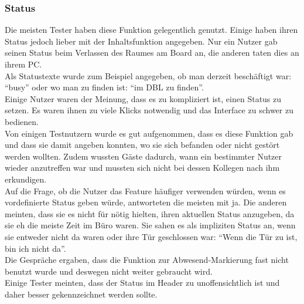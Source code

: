 


\subsubsection{Status}\label{Status}
Die meisten Tester haben diese Funktion gelegentlich genutzt.
Einige haben ihren Status jedoch lieber mit der Inhaltsfunktion angegeben.
Nur ein Nutzer gab seinen Status beim Verlassen des Raumes am Board an, die anderen taten dies an ihrem PC.
\\
Als Statustexte wurde zum Beispiel angegeben, ob man derzeit beschäftigt war: ``busy'' oder wo man zu finden ist: ``im DBL zu finden''.
\\
Einige Nutzer waren der Meinung, dass es zu kompliziert ist, einen Status zu setzen.
Es waren ihnen zu viele Klicks notwendig und das Interface zu schwer zu bedienen.
\\
Von einigen Testnutzern wurde es gut aufgenommen, dass es diese Funktion gab und dass sie damit angeben konnten, wo sie sich befanden oder nicht gestört werden wollten.
Zudem wussten Gäste dadurch, wann ein bestimmter Nutzer wieder anzutreffen war und mussten sich nicht bei dessen Kollegen nach ihm erkundigen.
\\
Auf die Frage, ob die Nutzer das Feature häufiger verwenden würden, wenn es vordefinierte Status geben würde, antworteten die meisten mit ja.
Die anderen meinten, dass sie es nicht für nötig hielten, ihren aktuellen Status anzugeben, da sie eh die meiste Zeit im Büro waren.
Sie sahen es als impliziten Status an, wenn sie entweder nicht da waren oder ihre Tür geschlossen war: ``Wenn die Tür zu ist, bin ich nicht da''.
\\
Die Gespräche ergaben, dass die Funktion zur Abwesend-Markierung fast nicht benutzt wurde und deswegen nicht weiter gebraucht wird.
\\
Einige Tester meinten, dass der Status im Header zu unoffensichtlich ist und daher besser gekennzeichnet werden sollte.

